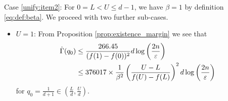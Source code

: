 \documentclass[onecolumn,letterpaper]{IEEEtran}
\newcommand{\cp}{{q}}
\newcommand{\up}{{U}}
\newcommand{\lw}{{L}}
\newcommand{\bet}{{\beta}}
\newcommand{\exifinal}{{ 376017 \times \frac{1}{\bet^2} \left( \frac{\up-\lw}{f(\up)-f(\lw)} \right)^2  d\log \left( \frac{2n}{\varepsilon } \right)}}
\newcommand{\ftaup}{{\hat{\Gamma}}}
\newcommand{\cpns}{\cp_0}
\begin{document}
Case \ref{unify:item2}: For $0 = \lw < \up \le d-1$, we have $\bet=1$ by definition \eqref{eq:def:beta}. 
We proceed with two further sub-cases.
\begin{itemize}
\item \underline{$\up=1$}:  From Proposition \ref{prop:existence_margin} we see that
    \begin{align}
    \ftaup(\cpns) &\le \frac{266.45}{(f(1)-f(0))^2} d \log \left( \frac{2n}{\varepsilon} \right) \notag\\
    &\le \exifinal
    \end{align}
    for $\cpns=\frac{1}{d+1}\in \left(\frac{\lw}{d},\frac{\up}{d}\right)$.
    

\end{itemize}
\end{document}
